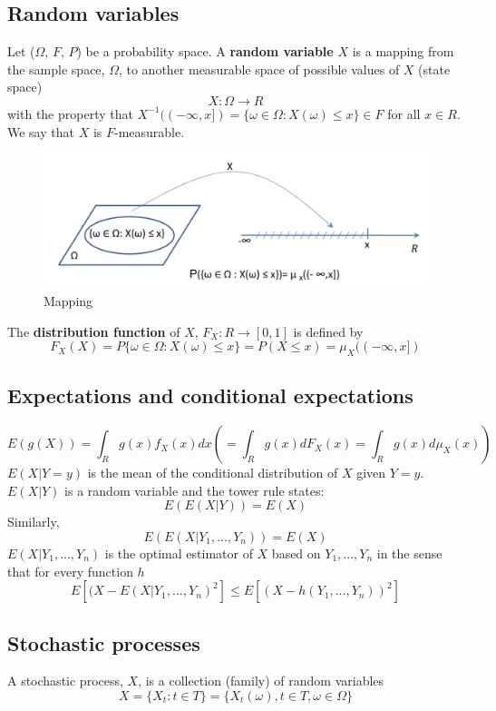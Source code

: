 \documentclass[11pt,a4paper]{book}
\theoremstyle{definition}\newtheorem{definition}{Definition}
\theoremstyle{definition}\newtheorem{fact}{Fact}
\theoremstyle{definition}\newtheorem{remark}{Remark}
\theoremstyle{definition}\newtheorem{ex}{Ex.}
\theoremstyle{definition}\newtheorem{project}{Project}
\theoremstyle{definition}\newtheorem{problem}{Problem}
\theoremstyle{definition}\newtheorem{example}{Example}
\numberwithin{theorem}{section}
\numberwithin{corollary}{chapter}
\numberwithin{assumption}{chapter}
\numberwithin{definition}{chapter}
\numberwithin{prop}{chapter}
\numberwithin{notation}{chapter}
\numberwithin{problem}{chapter}
\numberwithin{example}{chapter}
\numberwithin{fact}{chapter}
\numberwithin{ex}{chapter}
\begin{document}
\subsection{Random variables}
Let ($\Omega$, $F$, $P$) be a probability space. A \textbf{random variable} $X$ is a mapping from the sample space, $\Omega$, to another measurable space of possible values of $X$ (state space)
$$ X : \Omega \rightarrow R$$
with the property that $X^{-1}((-\infty, x]) = \{\omega \in \Omega : X(\omega) \leq x\} \in F$ for all $x \in R$. We say that $X$ is $F$-measurable.

\begin{figure}[H]
	\centering
	\includegraphics[scale=0.5]{Chapter01/Chapter1_1.png}
	\caption{Mapping}
\end{figure}

The \textbf{distribution function} of $X$, $F_X : R \rightarrow [0,1]$ is defined by
$$ F_X(X) = P \{\omega \in \Omega : X(\omega) \leq x \} = P(X \leq x) = \mu_X((-\infty, x]) $$

\subsection{Expectations and conditional expectations}

$$E(g(X)) = \int_R g(x) f_X(x) dx  (= \int_R g(x) dF_X(x) = \int_R g(x) d\mu_X(x)) $$
$E(X | Y=y)$ is the mean of the conditional distribution of $X$ given $Y=y$.
$E(X | Y)$ is a random variable and the tower rule states:
$$E(E(X | Y)) = E(X)$$
Similarly,
$$E(E(X | Y_1,...,Y_n)) = E(X)$$
$E(X | Y_1,...,Y_n)$ is the optimal estimator of $X$ based on $Y_1,...,Y_n$ in the sense that for every function $h$
$$ E[ (X-E(X | Y_1,...,Y_n)^2 ] \leq E[ (X - h(Y_1,...,Y_n))^2 ] $$

\subsection{Stochastic processes}

A stochastic process, $X$, is a collection (family) of random variables
$$ X = \{X_t : t \in T \} = \{X_t(\omega), t \in T, \omega \in \Omega \} $$
\end{document}
